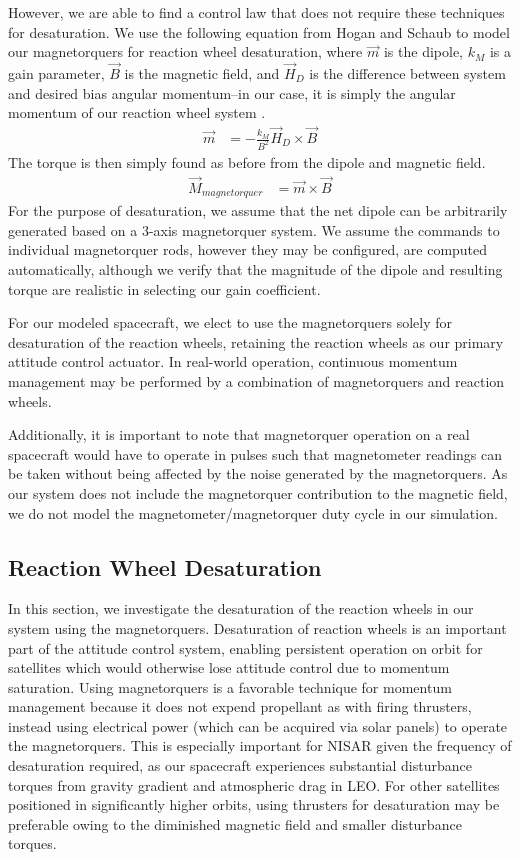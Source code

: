 However, we are able to find a control law that does not require these techniques for desaturation. We use the following equation from Hogan and Schaub to model our magnetorquers for reaction wheel desaturation, where $\Vec{m}$ is the dipole, $k_{M}$ is a gain parameter, $\Vec{B}$ is the magnetic field, and $\Vec{H}_{D}$ is the difference between system and desired bias angular momentum–in our case, it is simply the angular momentum of our reaction wheel system \cite{Hogan2015}.
\begin{align*}
    \Vec{m} &= -\frac{k_{M}}{B^{2}} \Vec{H}_{D} \times \Vec{B}
\end{align*}
The torque is then simply found as before from the dipole and magnetic field.
\begin{align*}
    \Vec{M}_{magnetorquer} &= \Vec{m} \times \Vec{B}
\end{align*}
For the purpose of desaturation, we assume that the net dipole can be arbitrarily generated based on a 3-axis magnetorquer system.  We assume the commands to individual magnetorquer rods, however they may be configured, are computed automatically, although we verify that the magnitude of the dipole and resulting torque are realistic in selecting our gain coefficient.

For our modeled spacecraft, we elect to use the magnetorquers solely for desaturation of the reaction wheels, retaining the reaction wheels as our primary attitude control actuator. In real-world operation, continuous momentum management may be performed by a combination of magnetorquers and reaction wheels.

Additionally, it is important to note that magnetorquer operation on a real spacecraft would have to operate in pulses such that magnetometer readings can be taken without being affected by the noise generated by the magnetorquers. As our system does not include the magnetorquer contribution to the magnetic field, we do not model the magnetometer/magnetorquer duty cycle in our simulation.

\subsection{Reaction Wheel Desaturation}
In this section, we investigate the desaturation of the reaction wheels in our system using the magnetorquers. Desaturation of reaction wheels is an important part of the attitude control system, enabling persistent operation on orbit for satellites which would otherwise lose attitude control due to momentum saturation. Using magnetorquers is a favorable technique for momentum management because it does not expend propellant as with firing thrusters, instead using electrical power (which can be acquired via solar panels) to operate the magnetorquers. This is especially important for NISAR given the frequency of desaturation required, as our spacecraft experiences substantial disturbance torques from gravity gradient and atmospheric drag in LEO. For other satellites positioned in significantly higher orbits, using thrusters for desaturation may be preferable owing to the diminished magnetic field and smaller disturbance torques.


